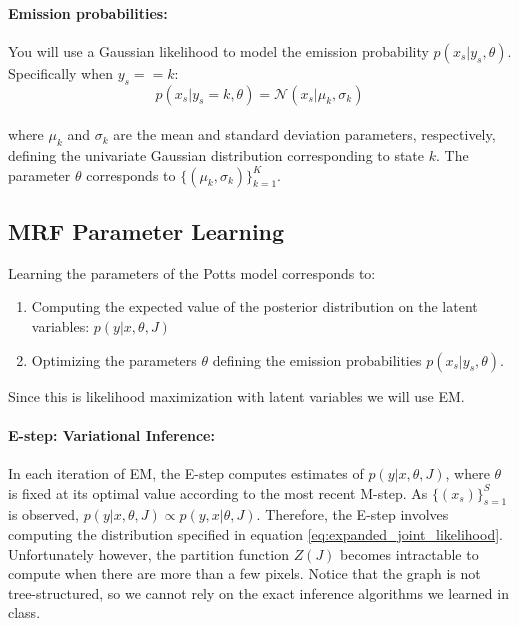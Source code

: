 \documentclass[11pt]{article}
\begin{document}
\paragraph{Emission probabilities:}

You will use a Gaussian likelihood to model the emission probability $p(x_s|y_s,\theta)$. Specifically when $y_s == k$:
\begin{equation}\label{eq:emission_function}
p(x_s|y_s=k,\theta)= \mathcal{N}(x_s | \mu_k, \sigma_k)
\end{equation}
\\
where $\mu_k$ and $\sigma_k$ are the mean and standard deviation parameters, respectively, defining the univariate Gaussian distribution corresponding to state $k$. The parameter $\theta$ corresponds to $\{ (\mu_k, \sigma_k) \}^K_{k=1}$.



\subsection{MRF Parameter Learning}

Learning the parameters of the Potts model corresponds to:

\begin{enumerate}
    \item Computing the expected value of the posterior distribution on the latent variables: $p(y|x,\theta,J)$
    \item Optimizing the parameters $\theta$ defining the emission probabilities $p(x_s|y_s, \theta)$.
\end{enumerate}

Since this is likelihood maximization with latent variables we will use EM.

\paragraph{E-step: Variational Inference:}
In each iteration of EM, the E-step computes estimates of $p(y|x,\theta,J)$, where $\theta$ is fixed at its optimal value according to the most recent M-step. As $\{ (x_s) \}^S_{s=1}$ is observed, $p(y|x,\theta,J) \propto p(y,x|\theta,J)$. Therefore, the E-step involves computing the distribution specified in equation \ref{eq:expanded_joint_likelihood}. Unfortunately however, the partition function $Z(J)$ becomes intractable to compute when there are more than a few pixels. Notice that the graph is not tree-structured, so we cannot rely on the exact inference algorithms we learned in class.
\end{document}
